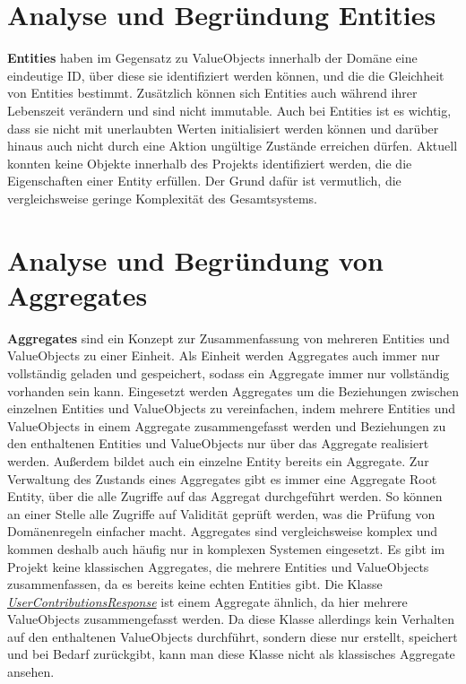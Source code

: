 \newpage

\section{Analyse und Begründung Entities}

\textbf{Entities} haben im Gegensatz zu ValueObjects innerhalb der Domäne eine eindeutige ID, über diese sie identifiziert werden können, und die die Gleichheit von Entities bestimmt. Zusätzlich können sich Entities auch während ihrer Lebenszeit verändern und sind nicht immutable.
Auch bei Entities ist es wichtig, dass sie nicht mit unerlaubten Werten initialisiert werden können und darüber hinaus auch nicht durch eine Aktion ungültige Zustände erreichen dürfen.
\newline
Aktuell konnten keine Objekte innerhalb des Projekts identifiziert werden, die die Eigenschaften einer Entity erfüllen.
Der Grund dafür ist vermutlich, die vergleichsweise geringe Komplexität des Gesamtsystems.

\newpage

\section{Analyse und Begründung von Aggregates}

\textbf{Aggregates} sind ein Konzept zur Zusammenfassung von mehreren Entities und ValueObjects zu einer Einheit. 
Als Einheit werden Aggregates auch immer nur vollständig geladen und gespeichert, sodass ein Aggregate immer nur vollständig vorhanden sein kann.
Eingesetzt werden Aggregates um die Beziehungen zwischen einzelnen Entities und ValueObjects zu vereinfachen, indem mehrere Entities und ValueObjects in einem Aggregate zusammengefasst werden und Beziehungen zu den enthaltenen Entities und ValueObjects nur über das Aggregate realisiert werden. 
Außerdem bildet auch ein einzelne Entity bereits ein Aggregate.
Zur Verwaltung des Zustands eines Aggregates gibt es immer eine Aggregate Root Entity, über die alle Zugriffe auf das Aggregat durchgeführt werden.
So können an einer Stelle alle Zugriffe auf Validität geprüft werden, was die Prüfung von Domänenregeln einfacher macht.
\newline
Aggregates sind vergleichsweise komplex und kommen deshalb auch häufig nur in komplexen Systemen eingesetzt.
Es gibt im Projekt keine klassischen Aggregates, die mehrere Entities und ValueObjects zusammenfassen, da es bereits keine echten Entities gibt.
Die Klasse \textit{\href{https://github.com/lukaspanni/OpenSourceStats/blob/main/app/src/main/java/de/lukaspanni/opensourcestats/data/UserContributionsResponse.java}{UserContributionsResponse}} ist einem Aggregate ähnlich, da hier mehrere ValueObjects zusammengefasst werden. 
Da diese Klasse allerdings kein Verhalten auf den enthaltenen ValueObjects durchführt, sondern diese nur erstellt, speichert und bei Bedarf zurückgibt, kann man diese Klasse nicht als klassisches Aggregate ansehen.


